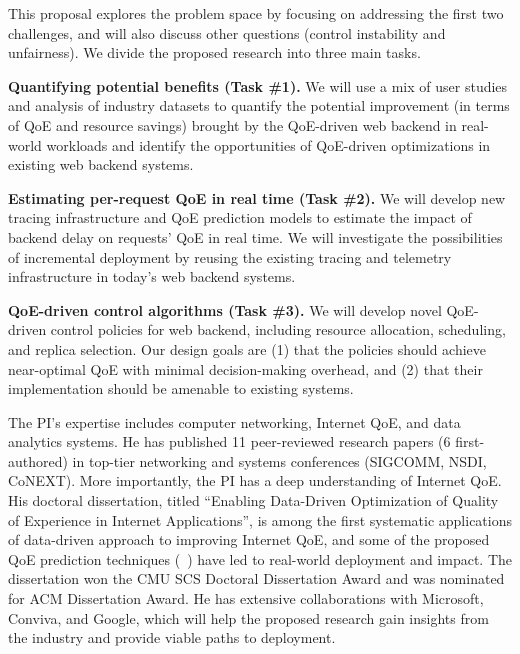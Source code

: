 This proposal explores the problem space by focusing on addressing the first two challenges, and will also discuss other questions (\eg control instability and unfairness).
We divide the proposed research into three main tasks. 

\begin{packeditemize}
\item{\bf Quantifying potential benefits (Task \#1).}
We will use a mix of user studies and analysis of industry datasets to quantify the potential improvement (in terms of QoE and resource savings) brought by the QoE-driven web backend in real-world workloads and identify the opportunities of QoE-driven optimizations in existing web backend systems.%

\item{\bf Estimating per-request QoE in real time (Task \#2).}
We will develop new tracing infrastructure and QoE prediction models to estimate the impact of backend delay on requests' QoE in real time. We will investigate the possibilities of incremental deployment by reusing the existing tracing and telemetry infrastructure in today's web backend systems.

\item{\bf QoE-driven control algorithms (Task \#3).}
We will develop novel QoE-driven control policies for web backend, including resource allocation, scheduling, and replica selection. Our design goals are (1) that the policies should achieve near-optimal QoE with minimal decision-making overhead, and (2) that their implementation should be amenable to existing systems.

\end{packeditemize}


The PI's expertise includes computer networking, Internet QoE, and data analytics systems.
He has published 11 peer-reviewed research papers (6 first-authored) in top-tier networking and systems conferences (\ie SIGCOMM, NSDI, CoNEXT).
More importantly, the PI has a deep understanding of Internet QoE. His doctoral dissertation, titled ``Enabling Data-Driven Optimization of Quality of Experience in Internet Applications'', is among the first systematic applications of data-driven approach to improving Internet QoE, and some of the proposed QoE prediction techniques (\eg~\cite{cfa,c3}) have led to real-world deployment and impact. The dissertation won the CMU SCS Doctoral Dissertation Award and was nominated for ACM Dissertation Award.
He has extensive collaborations with Microsoft, Conviva, and Google, which will help the proposed research gain insights from the industry and provide viable paths to deployment.

